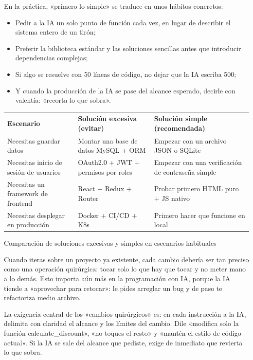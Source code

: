 En la práctica, «primero lo simple» se traduce en unos hábitos concretos:

\begin{itemize}
  \item Pedir a la IA un solo punto de función cada vez, en lugar de describir el sistema entero de un tirón;
  \item Preferir la biblioteca estándar y las soluciones sencillas antes que introducir dependencias complejas;
  \item Si algo se resuelve con 50 líneas de código, no dejar que la IA escriba 500;
  \item Y cuando la producción de la IA se pase del alcance esperado, decirle con valentía: «recorta lo que sobra».
\end{itemize}

\begin{center}
\begin{tabularx}{\linewidth}{|X|X|X|}
\hline
\textbf{Escenario} & \textbf{Solución excesiva (evitar)} & \textbf{Solución simple (recomendada)} \tabularnewline
\hline
Necesitas guardar datos & Montar una base de datos MySQL + ORM & Empezar con un archivo JSON o SQLite \tabularnewline
Necesitas inicio de sesión de usuarios & OAuth2.0 + JWT + permisos por roles & Empezar con una verificación de contraseña simple \tabularnewline
Necesitas un framework de frontend & React + Redux + Router & Probar primero HTML puro + JS nativo \tabularnewline
Necesitas desplegar en producción & Docker + CI/CD + K8s & Primero hacer que funcione en local \tabularnewline
\hline
\end{tabularx}
\end{center}

\begin{center}\small\color{gray}Comparación de soluciones excesivas y simples en escenarios habituales\end{center}


Cuando iteras sobre un proyecto ya existente, cada cambio debería ser tan preciso como una operación quirúrgica: tocar solo lo que hay que tocar y no meter mano a lo demás. Esto importa aún más en la programación con IA, porque la IA tiende a «aprovechar para retocar»: le pides arreglar un bug y de paso te refactoriza medio archivo.

La exigencia central de los «cambios quirúrgicos» es: en cada instrucción a la IA, delimita con claridad el alcance y los límites del cambio. Dile «modifica solo la función calculate\_discount», «no toques el resto» y «mantén el estilo de código actual». Si la IA se sale del alcance que pediste, exige de inmediato que revierta lo que sobra.

